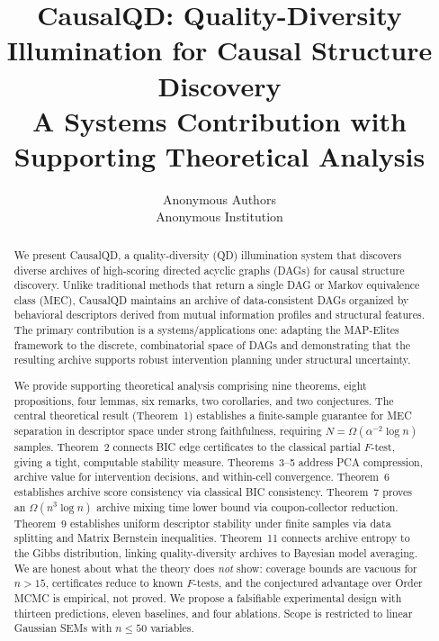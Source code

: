 \documentclass{article}
\title{CausalQD: Quality-Diversity Illumination for Causal Structure Discovery\\[6pt]
\large A Systems Contribution with Supporting Theoretical Analysis}
\author{
Anonymous Authors \\
Anonymous Institution
}
\date{}
\theoremstyle{definition}
\theoremstyle{plain}
\theoremstyle{remark}
\begin{document}
\maketitle

\begin{abstract}
We present CausalQD, a quality-diversity (QD) illumination system that discovers
diverse archives of high-scoring directed acyclic graphs (DAGs) for causal
structure discovery. Unlike traditional methods that return a single DAG or
Markov equivalence class (MEC), CausalQD maintains an archive of
data-consistent DAGs organized by behavioral descriptors derived from mutual
information profiles and structural features. The primary contribution is a
systems/applications one: adapting the MAP-Elites framework to the discrete,
combinatorial space of DAGs and demonstrating that the resulting archive supports
robust intervention planning under structural uncertainty.

We provide supporting theoretical analysis comprising nine theorems, eight
propositions, four lemmas, six remarks, two corollaries, and two conjectures.
The central theoretical result (Theorem~1)
establishes a finite-sample guarantee for MEC separation in descriptor space
under strong faithfulness, requiring $N = \Omega(\alpha^{-2}\log n)$ samples.
Theorem~2 connects BIC edge certificates to the classical partial $F$-test,
giving a tight, computable stability measure. Theorems~3--5 address PCA
compression, archive value for intervention decisions, and within-cell
convergence. Theorem~6 establishes archive score consistency via classical BIC
consistency. Theorem~7 proves an $\Omega(n^3 \log n)$ archive mixing time lower
bound via coupon-collector reduction. Theorem~9 establishes uniform descriptor
stability under finite samples via data splitting and Matrix Bernstein
inequalities. Theorem~11 connects archive entropy to the Gibbs distribution,
linking quality-diversity archives to Bayesian model averaging.
We are honest about what the theory does \emph{not} show: coverage
bounds are vacuous for $n > 15$, certificates reduce to known $F$-tests, and the
conjectured advantage over Order MCMC is empirical, not proved. We propose a
falsifiable experimental design with thirteen predictions, eleven baselines, and four
ablations. Scope is restricted to linear Gaussian SEMs with $n \leq 50$
variables.
\end{abstract}
\end{document}
